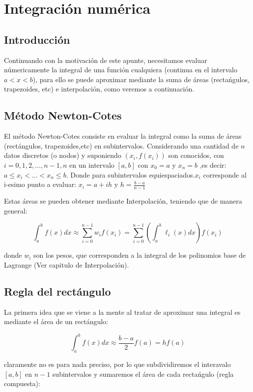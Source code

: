 \section{Integración numérica}
\subsection{Introducción}
Continuando con la motivación de este apunte, necesitamos evaluar  númericamente la integral de una función cualquiera (continua en el intervalo $a<x<b $), para ello se puede aproximar mediante la suma de áreas (rectańgulos, trapezoides, etc) e interpolación, como veremos a continuación.

\subsection{Método Newton-Cotes}
El método Newton-Cotes consiste en evaluar la integral como la suma de áreas (rectángulos, trapezoides,etc) en subintervalos. Considerando una cantidad de $n$ datos discretos (o nodos) y suponiendo $(x_i,f(x_i))$ son conocidos, con $i=0,1,2,...,n-1,n$ en un intervalo $[a,b]$ con $x_0=a$ y $x_n=b$ ,es decir: $a\leq x_i<...<x_n \leq b$. 
Donde para subintervalos equiespaciados.$x_i$ corresponde al i-esimo punto a evaluar: $x_i=a+ih$ y $h=\frac{b-a}{n-1}$

Estas áreas se pueden obtener mediante Interpolación, teniendo que  de manera general:

\begin{equation}
  \int_a^b f(x) dx \approx \sum_{i=0}^{n-1} w_i f(x_i) = \sum_{i=0}^{n-1} \left(\int_a^b \ell_i(x)dx\right)f(x_i) \label{nc-gral}
\end{equation}

donde $w_i$ son los pesos, que corresponden a la integral de los polinomios base de Lagrange (Ver capitulo de Interpolación). 

 \subsection{Regla del rectángulo}
La primera idea que se viene a la mente al tratar de aproximar una integral es mediante el área de un rectángulo:

\begin{equation*}
  \int_a^b f(x)dx \approx \frac{b-a}{2}f(a) = hf(a)   
\end{equation*}

claramente no es para nada preciso, por lo que subdividiremos el interavalo $[a,b]$ en $n-1$ subintervalos y sumaremos el área de cada rectańgulo (regla compuesta):

